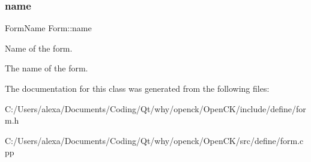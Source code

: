\subsubsection{\texorpdfstring{name}{name}}
{\footnotesize\ttfamily Form\+Name Form\+::name\hspace{0.3cm}{\ttfamily [protected]}}



Name of the form. 

The name of the form. 

The documentation for this class was generated from the following files\+:\begin{DoxyCompactItemize}
\item 
C\+:/\+Users/alexa/\+Documents/\+Coding/\+Qt/why/openck/\+Open\+C\+K/include/define/form.\+h\item 
C\+:/\+Users/alexa/\+Documents/\+Coding/\+Qt/why/openck/\+Open\+C\+K/src/define/form.\+cpp\end{DoxyCompactItemize}
